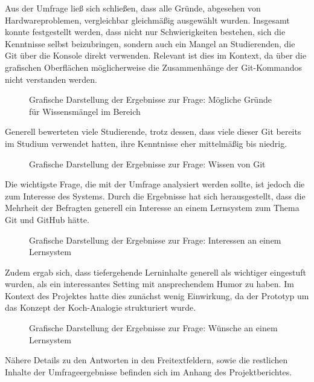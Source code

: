 Aus der Umfrage ließ sich schließen, dass alle Gründe, abgesehen von Hardwareproblemen, vergleichbar gleichmäßig ausgewählt wurden. Insgesamt konnte festgestellt werden, dass nicht nur Schwierigkeiten bestehen, sich die Kenntnisse selbst beizubringen, sondern auch ein Mangel an Studierenden, die Git über die Konsole direkt verwenden.
Relevant ist dies im Kontext, da über die grafischen Oberflächen möglicherweise die Zusammenhänge der Git-Kommandos nicht verstanden werden.

\begin{figure}[h!]
    \centering
    
    \caption{Grafische Darstellung der Ergebnisse zur Frage: Mögliche Gründe für Wissensmängel im Bereich}
\end{figure}

Generell bewerteten viele Studierende, trotz dessen, dass viele dieser Git bereits im Studium verwendet hatten, ihre Kenntnisse eher mittelmäßig bis niedrig.

\begin{figure}[h!]
    \centering
    
    \caption{Grafische Darstellung der Ergebnisse zur Frage: Wissen von Git}
\end{figure}

Die wichtigste Frage, die mit der Umfrage analysiert werden sollte, ist jedoch die zum Interesse des Systems. 
Durch die Ergebnisse hat sich herausgestellt, dass die Mehrheit der Befragten generell ein Interesse an einem Lernsystem zum Thema Git und GitHub hätte.

\begin{figure}[h!]
    \centering
    
    \caption{Grafische Darstellung der Ergebnisse zur Frage: Interessen an einem Lernsystem}
\end{figure}

Zudem ergab sich, dass tiefergehende Lerninhalte generell als wichtiger eingestuft wurden, als ein interessantes Setting mit ansprechendem Humor zu haben.
Im Kontext des Projektes hatte dies zunächst wenig Einwirkung, da der Prototyp um das Konzept der Koch-Analogie strukturiert wurde.

\begin{figure}[h!]
    \centering
    
    \caption{Grafische Darstellung der Ergebnisse zur Frage: Wünsche an einem Lernsystem}
\end{figure}

Nähere Details zu den Antworten in den Freitextfeldern, sowie die restlichen Inhalte der Umfrageergebnisse befinden sich im Anhang des Projektberichtes.
